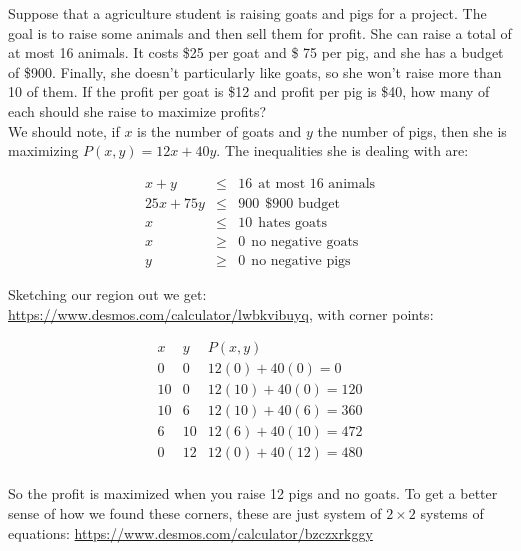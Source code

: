 \begin{example}

Suppose that a agriculture student is raising goats and pigs for a project.  The goal is to raise some animals and then sell them for profit.  She can raise a total of at most 16 animals.  It costs \$25 per goat and \$ 75 per pig, and she has a budget of \$900.  Finally, she doesn't particularly like goats, so she won't raise more than 10 of them.  If the profit per goat is \$12 and profit per pig is \$40, how many of each should she raise to maximize profits?\\

We should note, if $x$ is the number of goats and $y$ the number of pigs, then she is maximizing $P(x,y)=12x+40y$.  The inequalities she is dealing with are:

\begin{eqnarray*}
x+y&\leq&16\ \ \text{at most 16 animals}\\
25x+75y&\leq&900\ \ \text{\$900 budget}\\
x&\leq&10\ \ \text{hates goats}\\
x&\geq&0\ \ \text{no negative goats}\\
y&\geq&0\ \ \text{no negative pigs}
\end{eqnarray*}

Sketching our region out we get:  \url{https://www.desmos.com/calculator/lwbkvibuyq}, with corner points:

$$\begin{array}{c|c|c}
x & y & P(x,y)\\
\hline
0 & 0 & 12(0)+40(0)=0\\
10 & 0 & 12(10)+40(0)=120\\
10 & 6 & 12(10)+40(6)=360\\
6 & 10 & 12(6)+40(10)=472\\
0 & 12 & 12(0)+40(12)=480\\
\end{array}$$

So the profit is maximized when you raise 12 pigs and no goats.  To get a better sense of how we found these corners, these are just system of $2\times 2$ systems of equations: \url{https://www.desmos.com/calculator/bzczxrkggy}


\end{example}








